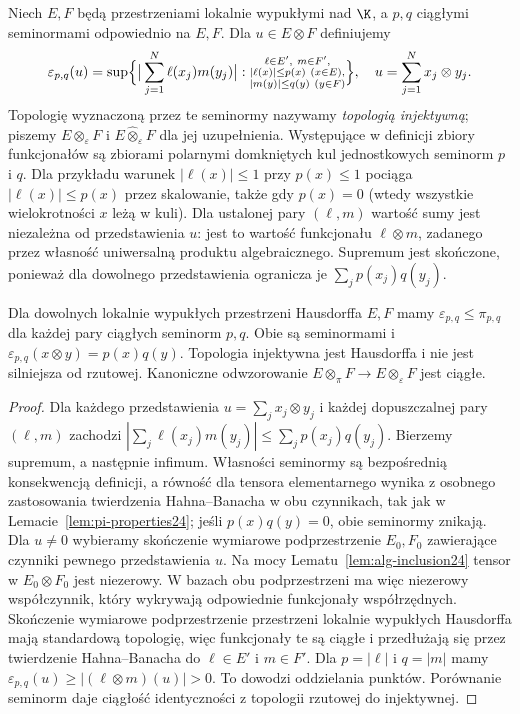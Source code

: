 \begin{definicja}
\label{def:eps-seminorm24}
Niech $E,F$ będą przestrzeniami lokalnie wypukłymi nad $\K$,
a $p,q$ ciągłymi seminormami odpowiednio na $E,F$.
Dla $u\in E\otimes F$ definiujemy
\[
 \varepsilon_{p,q}(u)=
 \sup\Bigl\{\big|\sum_{j=1}^N\ell(x_j)m(y_j)\big|:
 \substack{\ell\in E',\ m\in F',\\
             |\ell(x)|\le p(x)\ (x\in E),\\
             |m(y)|\le q(y)\ (y\in F)}\Bigr\},
 \quad u=\sum_{j=1}^N x_j\otimes y_j.
\]
Topologię wyznaczoną przez te seminormy nazywamy
\emph{topologią injektywną}; piszemy
$E\otimes_\varepsilon F$ i
$E\widehat\otimes_\varepsilon F$ dla jej uzupełnienia.
Występujące w definicji zbiory funkcjonałów są zbiorami
polarnymi domkniętych kul jednostkowych seminorm $p$ i $q$.
Dla przykładu warunek $|\ell(x)|\le1$ przy $p(x)\le1$
pociąga $|\ell(x)|\le p(x)$ przez skalowanie, także gdy
$p(x)=0$ (wtedy wszystkie wielokrotności $x$ leżą w kuli).
Dla ustalonej pary $(\ell,m)$ wartość sumy jest niezależna
od przedstawienia $u$: jest to wartość funkcjonału
$\ell\otimes m$, zadanego przez własność uniwersalną
produktu algebraicznego. Supremum jest skończone, ponieważ
dla dowolnego przedstawienia ogranicza je
$\sum_j p(x_j)q(y_j)$.
\end{definicja}

\begin{twierdzenie}
\label{thm:eps-pi24}
Dla dowolnych lokalnie wypukłych przestrzeni Hausdorffa
$E,F$ mamy $\varepsilon_{p,q}\le\pi_{p,q}$ dla każdej
pary ciągłych seminorm $p,q$. Obie są seminormami i
$\varepsilon_{p,q}(x\otimes y)=p(x)q(y)$.
Topologia injektywna jest Hausdorffa i nie jest silniejsza
od rzutowej. Kanoniczne odwzorowanie
$E\otimes_\pi F\to E\otimes_\varepsilon F$ jest ciągłe.
\end{twierdzenie}
\begin{proof}
Dla każdego przedstawienia $u=\sum_jx_j\otimes y_j$
i każdej dopuszczalnej pary $(\ell,m)$ zachodzi
$|\sum_j\ell(x_j)m(y_j)|\le\sum_jp(x_j)q(y_j)$.
Bierzemy supremum, a następnie infimum. Własności
seminormy są bezpośrednią konsekwencją definicji,
a równość dla tensora elementarnego wynika z osobnego
zastosowania twierdzenia Hahna--Banacha w obu czynnikach,
tak jak w Lemacie~\ref{lem:pi-properties24}; jeśli
$p(x)q(y)=0$, obie seminormy znikają.
Dla $u\ne0$ wybieramy skończenie wymiarowe podprzestrzenie
$E_0,F_0$ zawierające czynniki pewnego przedstawienia $u$.
Na mocy Lematu~\ref{lem:alg-inclusion24} tensor w
$E_0\otimes F_0$ jest niezerowy. W bazach obu
podprzestrzeni ma więc niezerowy współczynnik,
który wykrywają odpowiednie funkcjonały współrzędnych.
Skończenie wymiarowe podprzestrzenie przestrzeni
lokalnie wypukłych Hausdorffa mają standardową topologię,
więc funkcjonały te są ciągłe i przedłużają się przez
twierdzenie Hahna--Banacha do $\ell\in E'$ i $m\in F'$.
Dla $p=|\ell|$ i $q=|m|$ mamy
$\varepsilon_{p,q}(u)\ge|(\ell\otimes m)(u)|>0$.
To dowodzi oddzielania punktów.
Porównanie seminorm daje ciągłość identyczności z
topologii rzutowej do injektywnej.
\end{proof}

